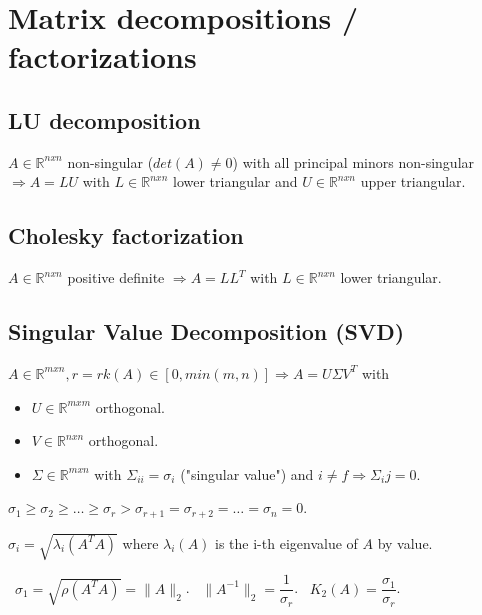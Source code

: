 \documentclass[]{article}
\begin{document}
	
	
	\section{Matrix decompositions / factorizations}
	
	\subsection{LU decomposition}
	
	$A \in \mathbb{R}^{nxn} $ non-singular ($det(A)\ne0$) with all principal minors non-singular $\Rightarrow A = L U$ with $L \in \mathbb{R}^{nxn}$ lower triangular and $U \in \mathbb{R}^{nxn}$ upper triangular.
	
	\subsection{Cholesky factorization}
	
	$A \in \mathbb{R}^{nxn} $ positive definite $\Rightarrow A = L L^T$ with $L \in \mathbb{R}^{nxn}$ lower triangular.
	
	\subsection{Singular Value Decomposition (SVD)}
	
	$A \in \mathbb{R}^{mxn}, r = rk(A)\in[0,min(m,n)] \Rightarrow A = U \Sigma V^T$ with 
	\begin{itemize}
		\item $U\in\mathbb{R}^{mxm}$ orthogonal.
		\item $V\in\mathbb{R}^{nxn}$ orthogonal.
		\item $\Sigma \in\mathbb{R}^{mxn}$ with $\Sigma_{ii}=\sigma_i$ ("singular value") and $i \ne f \Rightarrow \Sigma_ij=0$.
	\end{itemize}
	$\sigma_1 \ge \sigma_2 \ge \ldots \ge \sigma_r > \sigma_{r+1} = \sigma_{r+2} = \ldots = \sigma_n = 0$.

	$\sigma_i = \sqrt{\lambda_i(A^T A)}$ where $\lambda_i(A)$ is the i-th eigenvalue of $A$ by value.
	
	\ $\sigma_1 = \sqrt{\rho(A^T A)} = \lVert A \rVert_2$.
	\ $\lVert A^{-1} \rVert_2 = \dfrac{1}{\sigma_r}$.
	\ $K_2(A) = \dfrac{\sigma_1}{\sigma_r}$.
	
\end{document}
